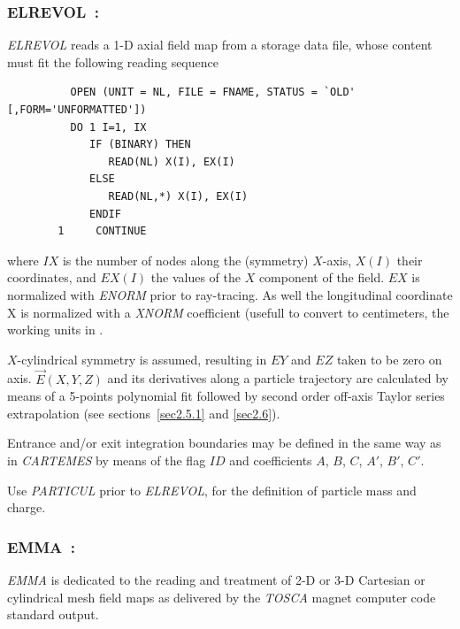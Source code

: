 \newpage

\subsubsection*{ELREVOL~: \ELREVOLTitl}  \label{ELREVOL}
\medskip

\textsl{ELREVOL}  reads a 1-D axial field map from a storage data file,
whose content must fit the following \FORTRAN reading sequence  


{\footnotesize
\begin{verbatim}
	      OPEN (UNIT = NL, FILE = FNAME, STATUS = `OLD' [,FORM='UNFORMATTED'])
	      DO 1 I=1, IX
	         IF (BINARY) THEN 
	            READ(NL) X(I), EX(I)
	         ELSE
	            READ(NL,*) X(I), EX(I)
	         ENDIF 
        1     CONTINUE
\end{verbatim}}%
\bigskip

\noindent where $IX$ is the number of nodes along the (symmetry) $X$-axis, $X(I)$ their 
coordinates, and $EX(I)$ the values of the $X$ component of the field. $EX$ is 
normalized with \textsl{ENORM} prior to ray-tracing. As well the longitudinal coordinate  X is normalized with 
a  \textsl{XNORM} coefficient (usefull to convert to centimeters, the working units in  \zgoubi. 


\bigskip

\noindent$X$-cylindrical symmetry is assumed, resulting in $EY$
and $EZ$ taken to be zero on axis. $ \vec  E(X,Y,Z) $ and its derivatives along a particle
trajectory are calculated by means of a 5-points polynomial fit followed by second 
order off-axis Taylor series extrapolation (see sections~\ref{sec2.5.1} and \ref{sec2.6}).  
\bigskip

\noindent Entrance and/or exit integration boundaries may be defined in the same way 
as in \textsl{CARTEMES} by means of the flag $ID$ and coefficients  
$A$, $B$, $C$, $A'$, $B'$, $C'$.  
\bigskip

\noindent Use \textsl{PARTICUL} prior to \textsl{ELREVOL}, for the
 definition of particle mass and charge.



\newpage

\subsubsection*{EMMA~: \EMMATitl} \label{EMMA} 
\medskip

 \textsl{EMMA} is dedicated to the reading and treatment of 2-D or 
3-D Cartesian or cylindrical mesh field maps as  delivered by the
\textsl{TOSCA}  magnet computer code standard output.

